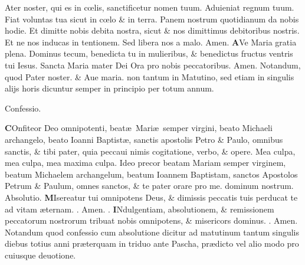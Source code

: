 \documentclass[a5paper,10pt]{book}
\def\ae{æ}
\def\oe{œ}
\begin{document}
\begin{multicols*}{2}
Ater noster, qui es in c\oe lis, sanctificetur nomen tuum.
\color{red} A\color{black}duieniat regnum tuum.
\color{red} F\color{black}iat voluntas tua sicut in c\oe lo \& in terra.
\color{red} P\color{black}anem nostrum quotidianum da nobis hodie.
\color{red} E\color{black}t dimitte nobis debita nostra, sicut \& nos dimittimus debitoribus nostris.
\color{red} E\color{black}t ne nos inducas in tentionem.
\color{red} S\color{black}ed libera nos a malo. Amen.
\lettrine[lines=2]{\bfseries \color{red} A}{}Ve Maria gratia plena. Dominus tecum, benedicta tu in mulieribus, \& benedictus fructus ventris tui Iesus.
\color{red} S\color{black}ancta Maria mater Dei Ora pro nobis peccatoribus. Amen.
\newline \color{red} Notandum, quod \color{black} Pater noster. \color{red} \& \color{black} Aue maria. \color{red} non tantum in Matutino, sed etiam in singulis alijs horis dicuntur semper in principio per totum annum. \color{black}
\vspace{-2em}
\begin{center} \color{red}
Confessio.
\end{center}
\vspace{-1em}
\lettrine[lines=2]{\bfseries \color{red} C}{}Onfiteor Deo omnipotenti, beat\ae \ Mari\ae \ semper virgini, beato Michaeli archangelo, beato Ioanni Baptist\ae , sanctis apostolis Petro \& Paulo, omnibus sanctis, \& \color{red} tibi pater, \color{black} quia peccaui nimis cogitatione, verbo, \& opere. Mea culpa, mea culpa, mea maxima culpa. Ideo precor beatam Mariam semper virginem, beatum Michaelem
archangelum, beatum Ioannem Baptistam, sanctos Apostolos Petrum \& Paulum, omnes sanctos, \& \color{red} te pater \color{black} orare pro me. dominum nostrum. \quad \color{red} Absolutio. \color{black}
\lettrine[lines=2]{\bfseries \color{red} M}{}Isereatur \color{red} tui \color{black} omnipotens Deus, \& dimissis peccatis tuis perducat te ad vitam \ae ternam. \color{red} \Rbar . \color{black} Amen. \color{red} \Vbar . \color{black}
\lettrine[lines=2]{\bfseries \color{red} I}{}Ndulgentiam, absolutionem, \& remissionem peccatorum nostrorum tribuat nobis omnipotens, \& misericors dominus. \color{red} \Rbar . \color{black} Amen.
\newline {} \color{red} Notandum quod confessio cum absolutione dicitur ad matutinum tantum singulis diebus totius anni pr\ae terquam in triduo ante Pascha, pr\ae dicto vel alio modo pro cuiusque deuotione.

\end{multicols*}
\end{document}

